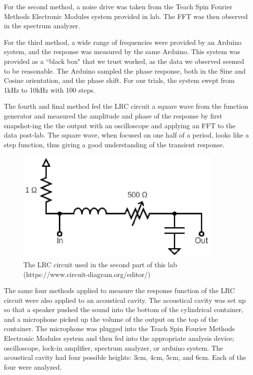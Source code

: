 \documentclass[12pt]{article}
\begin{document}
    For the second method, a noise drive was taken from the Teach Spin Fourier Methods Electronic Modules system provided in lab. The FFT was then observed in the spectrum analyzer. 
    
    For the third method, a wide range of frequencies were provided by an Arduino system, and the response was measured by the same Arduino. This system was provided as a ``black box" that we trust worked, as the data we observed seemed to be reasonable. The Arduino sampled the phase response, both in the Sine and Cosine orientation, and the phase shift. For our trials, the system swept from 1kHz to 10kHz with 100 steps. 
    
    The fourth and final method fed the LRC circuit a square wave from the function generator and measured the amplitude and phase of the response by first snapshot-ing the the output with an oscilloscope and applying an FFT to the data post-lab. The square wave, when focused on one half of a period, looks like a step function, thus giving a good understanding of the transient response. 
    
    \begin{figure}[!ht]
    \centering
    \includegraphics[width=4in]{circuit}
    \caption{The LRC circuit used in the second part of this lab (https://www.circuit-diagram.org/editor/)}
    \label{fig:circuit}
    \end{figure}
   
    The same four methods applied to measure the response function of the LRC circuit were also applied to an acoustical cavity. The acoustical cavity was set up so that a speaker pushed the sound into the bottom of the cylindrical container, and a microphone picked up the volume of the output on the top of the container. The microphone was plugged into the Teach Spin Fourier Methods Electronic Modules system and then fed into the appropriate analysis device; oscilloscope, lock-in amplifier, spectrum analyzer, or arduino system. The acoustical cavity had four possible heights: 3cm, 4cm, 5cm, and 6cm. Each of the four were analyzed. 
    
\end{document}
